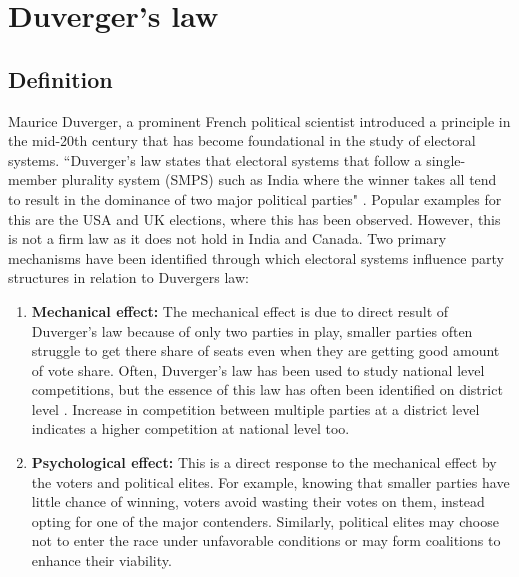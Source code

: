 \begin{sloppypar}
\section{Duverger's law}
\subsection{Definition}
Maurice Duverger, a prominent French political scientist introduced a principle in the mid-20th century that has  become foundational in the study of electoral systems. ``Duverger's law states that electoral systems that follow a single-member plurality system (SMPS) such as India where the winner takes all tend to result in the dominance of two major political parties" \citep{duverger1954political}. Popular examples for this are the USA and UK elections, where this has been observed. However, this is not a firm law as it does not hold in India and Canada.
Two primary mechanisms have been identified through which electoral systems influence party structures in relation to Duvergers law:
 \begin{enumerate}
     \item \textbf{Mechanical effect:}  The mechanical effect is due to direct result of Duverger’s law  because of only two parties in play, smaller parties often struggle to get there share of seats even when they are getting good amount of vote share. Often, Duverger's law has been used to study national level competitions, but the essence of this law has often been identified on district level \citep{cox1997making,GALLAGHER199133,lijphart1994,rae1971political}. Increase in competition between multiple parties at a district level indicates a higher competition at national level too.
     \item \textbf{Psychological effect:} This is a direct response to the mechanical effect by the voters and political elites. For example, knowing that smaller parties have little chance of winning, voters avoid wasting their votes on them, instead opting for one of the major contenders. Similarly, political elites may choose not to enter the race under unfavorable conditions or may form coalitions to enhance their viability.
 \end{enumerate}

\end{sloppypar}

